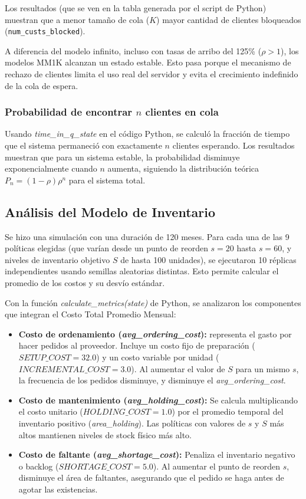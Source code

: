 \documentclass{article}
\begin{document}
Los resultados (que se ven en la tabla generada por el script de Python) muestran que a menor tamaño de cola ($K$) mayor cantidad de clientes bloqueados (\texttt{num\_custs\_blocked}).

A diferencia del modelo infinito, incluso con tasas de arribo del 125\% ($\rho > 1$), los modelos MM1K alcanzan un estado estable. Esto pasa porque el mecanismo de rechazo de clientes limita el uso real del servidor y evita el crecimiento indefinido de la cola de espera.

\subsubsection{Probabilidad de encontrar $n$ clientes en cola}
Usando \textit{time\_in\_q\_state} en el código Python, se calculó la fracción de tiempo que el sistema permaneció con exactamente $n$ clientes esperando. Los resultados muestran que para un sistema estable, la probabilidad disminuye exponencialmente cuando $n$ aumenta, siguiendo la distribución teórica $P_n = (1-\rho)\rho^n$ para el sistema total.



\subsection{Análisis del Modelo de Inventario}

Se hizo una simulación con una duración de 120 meses. Para cada una de las 9 políticas elegidas (que varían desde un punto de reorden $s=20$ hasta $s=60$, y niveles de inventario objetivo $S$ de hasta 100 unidades), se ejecutaron 10 réplicas independientes usando semillas aleatorias distintas. Esto permite calcular el promedio de los costos y su desvío estándar.

Con la función \textit{calculate\_metrics(state)} de Python, se analizaron los componentes que integran el Costo Total Promedio Mensual:

\begin{itemize}
    \item \textbf{Costo de ordenamiento (\textit{avg\_ordering\_cost}):} representa el gasto por hacer pedidos al proveedor. Incluye un costo fijo de preparación ($SETUP\_COST = 32.0$) y un costo variable por unidad ($INCREMENTAL\_COST = 3.0$). Al aumentar el valor de $S$ para un mismo $s$, la frecuencia de los pedidos disminuye, y disminuye el \textit{avg\_ordering\_cost}.
    \item \textbf{Costo de mantenimiento (\textit{avg\_holding\_cost}):} Se calcula multiplicando el costo unitario ($HOLDING\_COST = 1.0$) por el promedio temporal del inventario positivo (\textit{area\_holding}). Las políticas con valores de $s$ y $S$ más altos mantienen niveles de stock físico más alto.
    \item \textbf{Costo de faltante (\textit{avg\_shortage\_cost}):} Penaliza el inventario negativo o backlog ($SHORTAGE\_COST = 5.0$). Al aumentar el punto de reorden $s$, disminuye el área de faltantes, asegurando que el pedido se haga antes de agotar las existencias.
\end{itemize}
\end{document}
